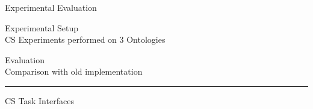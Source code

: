 \documentclass[final,hyperref={pdfpagelabels=true}]{beamer}
\newenvironment{myhline}
 {\par\setlength{\topskip}{0em}%
  \begin{list}{}{%
    \setlength{\leftmargin}{0em}%
    \setlength{\rightmargin}{3em}%
  }\item\relax}
 {\par\nopagebreak\rule{\linewidth}{0.4pt}\end{list}}
\begin{document}
\begin{frame}
\begin{columns}[t, onlytextwidth]
\begin{column}{\textwidth}
		
		\begin{columns}[t, onlytextwidth]
			\begin{column}{.49\linewidth}
				\begin{block}{Experimental Evaluation}
					\begin{minipage}[t][.25\textheight][c]{\textwidth}
						\begin{minipage}[t]{.45\textwidth}
							\small
							Experimental Setup\\
							CS Experiments performed on 3 Ontologies\\
						\end{minipage}
						\begin{minipage}[t]{.45\textwidth}
							\small
							Evaluation\\
							Comparison with old implementation
						\end{minipage}
						\begin{myhline}
							\vspace{-2cm}
							\hfill
						\end{myhline}
						\begin{minipage}[t]{\textwidth}
							
							\small
							CS Task Interfaces
                    	

\end{minipage}
\end{minipage}
\end{block}
\end{column}
\end{columns}
\end{column}
\end{columns}
\end{frame}
\end{document}
